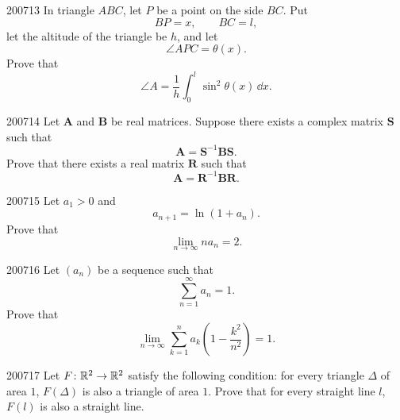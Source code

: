 \begin{problem}{2007}{1}{3}
In triangle $ABC$, let $P$ be a point on the side $BC$. Put
\[
    BP=x,
    \qquad
    BC=l,
\]
let the altitude of the triangle be $h$, and let
\[
    \angle APC=\theta(x).
\]
Prove that
\[
    \angle A=\frac1h\int_0^l\sin^2\theta(x)\, \dd x.
\]
\end{problem}

\begin{problem}{2007}{1}{4}
Let $\mathbf A$ and $\mathbf B$ be real matrices. Suppose there exists a complex matrix $\mathbf S$ such that
\[
    \mathbf A=\mathbf S^{-1}\mathbf B\mathbf S.
\]
Prove that there exists a real matrix $\mathbf R$ such that
\[
    \mathbf A=\mathbf R^{-1}\mathbf B\mathbf R.
\]
\end{problem}

\begin{problem}{2007}{1}{5}
Let $a_1>0$ and
\[
    a_{n+1}=\ln(1+a_n).
\]
Prove that
\[
    \lim_{n\to\infty}n a_n=2.
\]
\end{problem}

\begin{problem}{2007}{1}{6}
Let $(a_n)$ be a sequence such that
\[
    \sum_{n=1}^{\infty}a_n=1.
\]
Prove that
\[
    \lim_{n\to\infty}
    \sum_{k=1}^{n}a_k\left(1-\frac{k^2}{n^2}\right)=1.
\]
\end{problem}

\begin{problem}{2007}{1}{7}
Let $F\colon\mathbb{R}^2\to\mathbb{R}^2$ satisfy the following condition: for every triangle $\Delta$ of area $1$, $F(\Delta)$ is also a triangle of area $1$. Prove that for every straight line $l$, $F(l)$ is also a straight line.
\end{problem}
